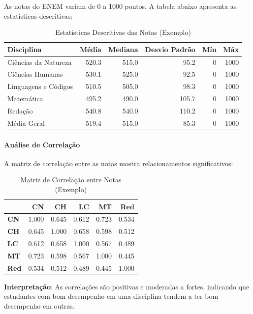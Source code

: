 \documentclass[12pt,a4paper]{article}
\begin{document}
As notas do ENEM variam de 0 a 1000 pontos. A tabela abaixo apresenta as estatísticas descritivas:

\begin{table}[H]
\centering
\begin{tabular}{|l|r|r|r|r|r|}
\hline
\textbf{Disciplina} & \textbf{Média} & \textbf{Mediana} & \textbf{Desvio Padrão} & \textbf{Mín} & \textbf{Máx} \\
\hline
Ciências da Natureza & 520.3 & 515.0 & 95.2 & 0 & 1000 \\
\hline
Ciências Humanas & 530.1 & 525.0 & 92.5 & 0 & 1000 \\
\hline
Linguagens e Códigos & 510.5 & 505.0 & 98.3 & 0 & 1000 \\
\hline
Matemática & 495.2 & 490.0 & 105.7 & 0 & 1000 \\
\hline
Redação & 540.8 & 540.0 & 110.2 & 0 & 1000 \\
\hline
Média Geral & 519.4 & 515.0 & 85.3 & 0 & 1000 \\
\hline
\end{tabular}
\caption{Estatísticas Descritivas das Notas (Exemplo)}
\end{table}

\paragraph{Análise de Correlação}

A matriz de correlação entre as notas mostra relacionamentos significativos:

\begin{table}[H]
\centering
\begin{tabular}{|l|r|r|r|r|r|}
\hline
 & \textbf{CN} & \textbf{CH} & \textbf{LC} & \textbf{MT} & \textbf{Red} \\
\hline
\textbf{CN} & 1.000 & 0.645 & 0.612 & 0.723 & 0.534 \\
\hline
\textbf{CH} & 0.645 & 1.000 & 0.658 & 0.598 & 0.512 \\
\hline
\textbf{LC} & 0.612 & 0.658 & 1.000 & 0.567 & 0.489 \\
\hline
\textbf{MT} & 0.723 & 0.598 & 0.567 & 1.000 & 0.445 \\
\hline
\textbf{Red} & 0.534 & 0.512 & 0.489 & 0.445 & 1.000 \\
\hline
\end{tabular}
\caption{Matriz de Correlação entre Notas (Exemplo)}
\end{table}

\textbf{Interpretação}: As correlações são positivas e moderadas a fortes, indicando que estudantes com bom desempenho em uma disciplina tendem a ter bom desempenho em outras.
\end{document}
